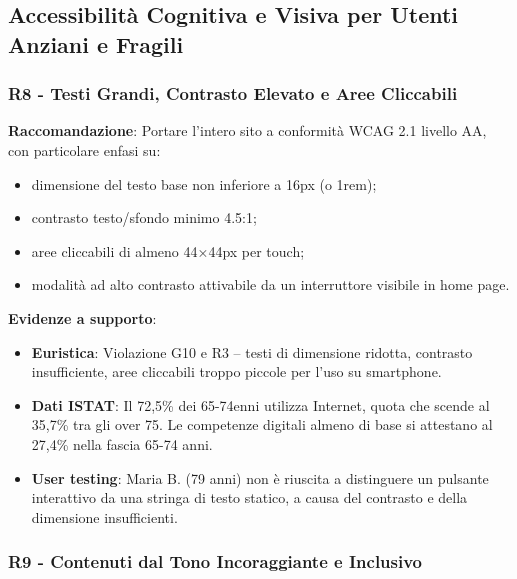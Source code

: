 \documentclass[11pt,a4paper]{article}
\begin{document}

\subsection{Accessibilit\`a Cognitiva e Visiva per Utenti Anziani e Fragili}

\subsubsection{R8 - Testi Grandi, Contrasto Elevato e Aree Cliccabili}
\label{rec:R8}

\textbf{Raccomandazione}: Portare l'intero sito a conformit\`a WCAG 2.1 livello
AA, con particolare enfasi su:
\begin{itemize}
    \item dimensione del testo base non inferiore a 16px (o 1rem);
    \item contrasto testo/sfondo minimo 4.5:1;
    \item aree cliccabili di almeno 44×44px per touch;
    \item modalit\`a ad alto contrasto attivabile da un interruttore visibile
    in home page.
\end{itemize}

\textbf{Evidenze a supporto}:
\begin{itemize}
    \item \textbf{Euristica}: Violazione G10 e R3 -- testi di dimensione ridotta,
    contrasto insufficiente, aree cliccabili troppo piccole per l'uso su
    smartphone.
    \item \textbf{Dati ISTAT}: Il 72,5\% dei 65-74enni utilizza Internet,
    quota che scende al 35,7\% tra gli over 75. Le competenze digitali almeno
    di base si attestano al 27,4\% nella fascia 65-74 anni.
    \item \textbf{User testing}: Maria B. (79 anni) non \`e riuscita a distinguere
    un pulsante interattivo da una stringa di testo statico, a causa del
    contrasto e della dimensione insufficienti.
\end{itemize}

\subsubsection{R9 - Contenuti dal Tono Incoraggiante e Inclusivo}
\label{rec:R9}
\end{document}
